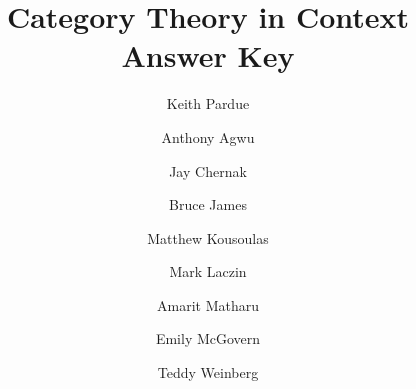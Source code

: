 \documentclass{report}
\begin{document}
\title{Category Theory in Context\\
Answer Key}
\author{
	Keith Pardue\and
	Anthony Agwu\and
	Jay Chernak\and
	Bruce James\and
	Matthew Kousoulas\and
	Mark Laczin\and
	Amarit Matharu\and
	Emily McGovern\and
	Teddy Weinberg
}

\maketitle
\tableofcontents

% 
% 
% 
\end{document}
